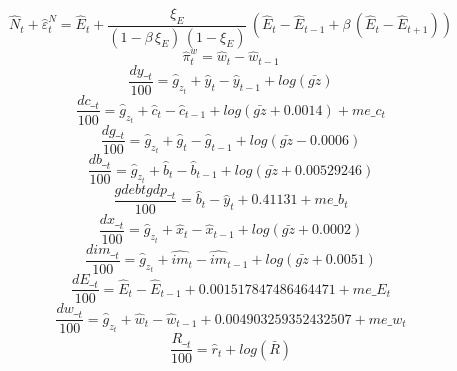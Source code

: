 \begin{dmath}
{\hat{N}_{t}}+{\hat{\varepsilon}^N_{t}}={\hat{E}_{t}}+\frac{{\xi_E}}{\left(1-{\beta}\, {\xi_E}\right)\, \left(1-{\xi_E}\right)}\, \left({\hat{E}_{t}}-{\hat{E}_{t-1}}+{\beta}\, \left({\hat{E}_{t}}-{\hat{E}_{t+1}}\right)\right)
\end{dmath}
\begin{dmath}
{\hat{\pi}^w_{t}}={\hat{w}_{t}}-{\hat{w}_{t-1}}
\end{dmath}
\begin{dmath}
\frac{{dy\__{t}}}{100}={\hat{g}_z_{t}}+{\hat{y}_{t}}-{\hat{y}_{t-1}}+log\left({\bar{gz}}\right)
\end{dmath}
\begin{dmath}
\frac{{dc\__{t}}}{100}={\hat{g}_z_{t}}+{\hat{c}_{t}}-{\hat{c}_{t-1}}+log\left({\bar{gz}}+0.0014\right)+{me\_c_{t}}
\end{dmath}
\begin{dmath}
\frac{{dg\__{t}}}{100}={\hat{g}_z_{t}}+{\hat{g}_{t}}-{\hat{g}_{t-1}}+log\left({\bar{gz}}-0.0006\right)
\end{dmath}
\begin{dmath}
\frac{{db\__{t}}}{100}={\hat{g}_z_{t}}+{\hat{b}_{t}}-{\hat{b}_{t-1}}+log\left({\bar{gz}}+0.00529246\right)
\end{dmath}
\begin{dmath}
\frac{{gdebtgdp\__{t}}}{100}={\hat{b}_{t}}-{\hat{y}_{t}}+0.41131+{me\_b_{t}}
\end{dmath}
\begin{dmath}
\frac{{dx\__{t}}}{100}={\hat{g}_z_{t}}+{\hat{x}_{t}}-{\hat{x}_{t-1}}+log\left({\bar{gz}}+0.0002\right)
\end{dmath}
\begin{dmath}
\frac{{dim\__{t}}}{100}={\hat{g}_z_{t}}+{\hat{im}_{t}}-{\hat{im}_{t-1}}+log\left({\bar{gz}}+0.0051\right)
\end{dmath}
\begin{dmath}
\frac{{dE\__{t}}}{100}={\hat{E}_{t}}-{\hat{E}_{t-1}}+0.001517847486464471+{me\_E_{t}}
\end{dmath}
\begin{dmath}
\frac{{dw\__{t}}}{100}={\hat{g}_z_{t}}+{\hat{w}_{t}}-{\hat{w}_{t-1}}+0.004903259352432507+{me\_w_{t}}
\end{dmath}
\begin{dmath}
\frac{{R\__{t}}}{100}={\hat{r}_{t}}+log\left({\bar{R}}\right)
\end{dmath}
